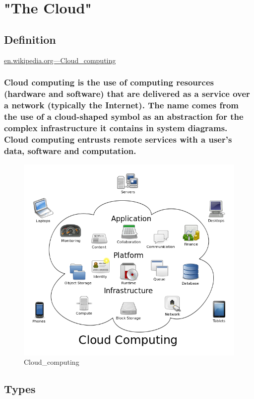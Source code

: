\documentclass{article}
\begin{document}
\title{}
\section{"The Cloud"}
\subsection{Definition}

\href{http://en.wikipedia.org/wiki/Cloud\_computing}{en.wikipedia.org—Cloud\_computing}
\subsubsection{Cloud computing is the use of computing resources (hardware and software) that are delivered as a service over a network (typically the Internet). The name comes from the use of a cloud-shaped symbol as an abstraction for the complex infrastructure it contains in system diagrams. Cloud computing entrusts remote services with a user's data, software and computation.}



\begin{figure}
\includegraphics{Cloud_computing.png}
\caption{Cloud\_computing}
\label{fig:att1}
\end{figure}
\subsection{Types}
\end{document}
